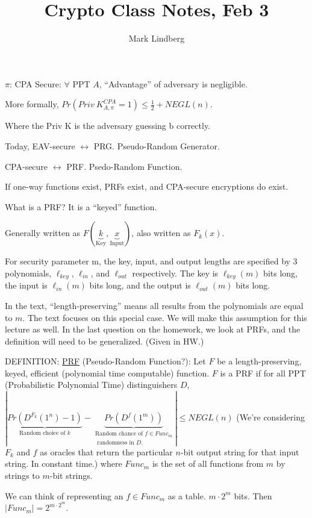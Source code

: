 \documentclass[11pt]{article}
\title{Crypto Class Notes, Feb 3}
\author{Mark Lindberg}
\date{}
\begin{document}
\pagestyle{plain}
\maketitle

$\pi$: CPA Secure: $\forall$ PPT $A$, ``Advantage'' of adversary is negligible.

More formally, $Pr(Priv\ K^{CPA}_{A,\pi}=1)\leq\frac{1}{2}+NEGL(n)$.

Where the Priv K is the adversary guessing b correctly.

Today, EAV-secure $\leftrightarrow$ PRG. Pseudo-Random Generator.

CPA-secure $\leftrightarrow$ PRF. Psedo-Random Function.

If one-way functions exist, PRFs exist, and CPA-secure encryptions do exist.

What is a PRF? It is a ``keyed'' function.

Generally written as $F(\underbrace{k}_{\text{Key}},\underbrace{x}_{\text{Input}})$, also written as $F_k(x)$.

For security parameter m, the key, input, and output lengths are specified by 3 polynomials, $\ell_{key}$, $\ell_{in}$, and $\ell_{out}$ respectively. The key is $\ell_{key}(m)$ bits long, the input is $\ell_{in}(m)$ bits long, and the output is $\ell_{out}(m)$ bits long.

In the text, ``length-preserving'' means all results from the polynomials are equal to $m$. The text focuses on this special case. We will make this assumption for this lecture as well. In the last question on the homework, we look at PRFs, and the definition will need to be generalized. (Given in HW.)

DEFINITION: \underline{PRF} (Pseudo-Random Function?): Let $F$ be a length-preserving, keyed, efficient (polynomial time computable) function. $F$ is a PRF if for all PPT (Probabilistic Polynomial Time) distinguishers $D$, $|\underbrace{Pr(D^{F_k}(1^n)-1)}_{\text{Random choice of $k$}}-\underbrace{Pr(D^f(1^m))}_{\substack{\text{Random chance of $f\in Func_m$}\\\text{ randomness in $D$.}}}|\leq NEGL(n)$ (We're considering $F_k$ and $f$ as oracles that return the particular $n$-bit output string for that input string. In constant time.) where $Func_m$ is the set of all functions from $m$ by strings to $m$-bit strings.

We can think of representing an $f\in Func_m$ as a table. $m\cdot 2^m$ bits. Then $|Func_m|=2^{m\cdot2^m}$.
\end{document}
